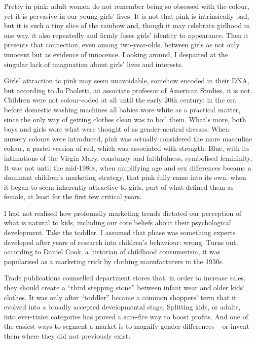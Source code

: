 Pretty in pink: adult women do not remember being so obsessed with the colour, yet it is pervasive in our young girls' lives. It is not that pink is intrinsically bad, but it is such a tiny slice of the rainbow and, though it may celebrate girlhood in one way, it also repeatedly and firmly fuses girls' identity to appearance. Then it presents that connection, even among two-year-olds, between girls as not only innocent but as evidence of innocence. Looking around, I despaired at the singular lack of imagination about girls' lives and interests.


Girls' attraction to pink may seem unavoidable, somehow encoded in their DNA, but according to Jo Paoletti, an associate professor of American Studies, it  is not. Children were not colour-coded at all until the early 20th century: in the era before domestic washing machines all babies wore white as a practical matter, since the only way of getting clothes clean was to boil them. What's more, both  boys and girls wore what were thought of as gender-neutral dresses. When nursery colours were introduced, pink was actually considered the more masculine colour, a pastel version of red, which was associated with strength. Blue, with its intimations of the Virgin Mary, constancy and faithfulness, symbolised femininity. It was not until the mid-1980s, when amplifying age and sex differences became a dominant children's marketing strategy, that pink fully came into its own, when it began to seem inherently attractive to girls, part of what defined them as female,  at least for the first few critical years.


I had not realised how profoundly marketing trends dictated our perception of what is natural to kids, including our core beliefs about their psychological development. Take the toddler. I assumed that phase was something experts developed after years of research into children's behaviour: wrong. Turns out, according to Daniel Cook, a historian of childhood consumerism, it was popularised as a marketing trick by clothing manufacturers in the 1930s.


Trade publications counselled department stores that, in order to increase sales, they should create a ``third stepping stone'' between infant wear and older kids' clothes. It was only after ``toddler'' became a common shoppers' term that it evolved into a broadly accepted developmental stage. Splitting kids, or adults, into ever-tinier categories has proved a sure-fire way to boost profits. And one of the easiest ways to segment a market is to magnify gender differences – or invent them where they did not previously exist.